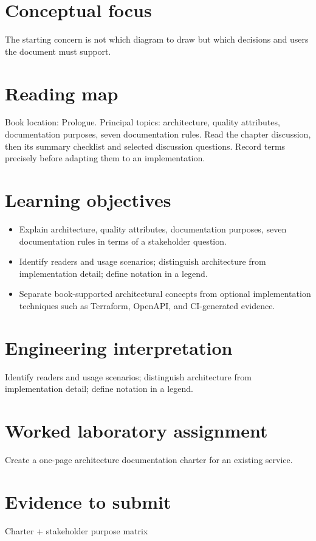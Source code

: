 \documentclass[10pt,letterpaper]{article}
\begin{document}
\DocProvenance
\section{Conceptual focus}
The starting concern is not which diagram to draw but which decisions and users the document must support.

\section{Reading map}
Book location: Prologue. Principal topics: architecture, quality attributes, documentation purposes, seven documentation rules. Read the chapter discussion, then its summary checklist and selected discussion questions. Record terms precisely before adapting them to an implementation.

\section{Learning objectives}
\begin{itemize}
\item Explain architecture, quality attributes, documentation purposes, seven documentation rules in terms of a stakeholder question.
\item Identify readers and usage scenarios; distinguish architecture from implementation detail; define notation in a legend.
\item Separate book-supported architectural concepts from optional implementation techniques such as Terraform, OpenAPI, and CI-generated evidence.
\end{itemize}
\section{Engineering interpretation}
Identify readers and usage scenarios; distinguish architecture from implementation detail; define notation in a legend.

\section{Worked laboratory assignment}
Create a one-page architecture documentation charter for an existing service.

\section{Evidence to submit}
Charter + stakeholder purpose matrix
\end{document}
